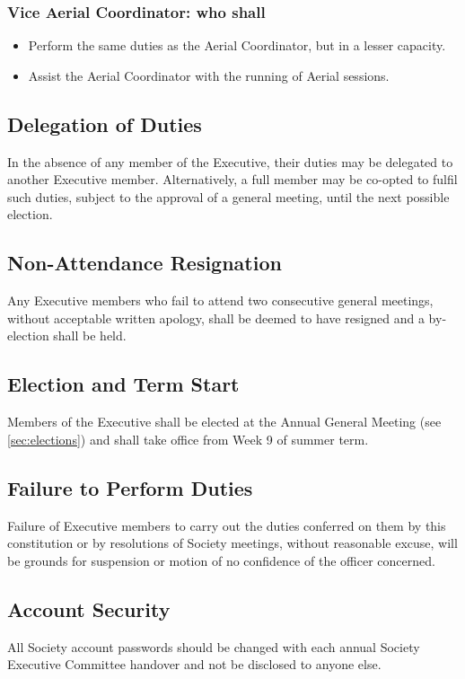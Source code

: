 \documentclass[11pt,a4paper]{article}
\begin{document}
\subsubsection{Vice Aerial Coordinator: who shall}
\begin{itemize}
    \item Perform the same duties as the Aerial Coordinator, but in a lesser capacity.
    \item Assist the Aerial Coordinator with the running of Aerial sessions.
\end{itemize}

\subsection{Delegation of Duties}
In the absence of any member of the Executive, their duties may be delegated to another Executive member. Alternatively, a full member may be co-opted to fulfil such duties, subject to the approval of a general meeting, until the next possible election.

\subsection{Non-Attendance Resignation}
Any Executive members who fail to attend two consecutive general meetings, without acceptable written apology, shall be deemed to have resigned and a by-election shall be held.

\subsection{Election and Term Start}
Members of the Executive shall be elected at the Annual General Meeting (see \autoref{sec:elections}) and shall take office from Week 9 of summer term.

\subsection{Failure to Perform Duties}
Failure of Executive members to carry out the duties conferred on them by this constitution or by resolutions of Society meetings, without reasonable excuse, will be grounds for suspension or motion of no confidence of the officer concerned.

\subsection{Account Security}
All Society account passwords should be changed with each annual Society Executive Committee handover and not be disclosed to anyone else.
\end{document}
